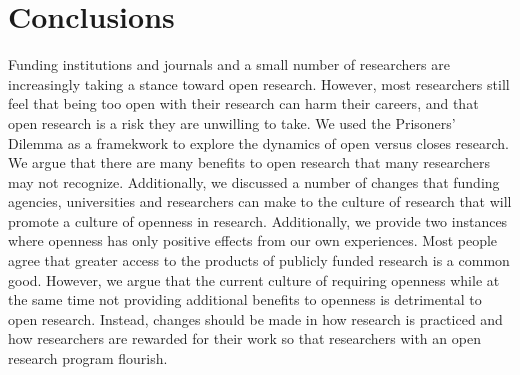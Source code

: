 \documentclass[11pt]{article} %
\begin{document}
\section{Conclusions}
Funding institutions and journals and a small number of researchers are increasingly taking a stance toward open research. However, most researchers still feel that being too open with their research can harm their careers, and that open research is a risk they are unwilling to take. We used the Prisoners' Dilemma as a framekwork to explore the dynamics of open versus closes research. We argue that there are many benefits to open research that many researchers may not recognize. Additionally, we discussed a number of changes that funding agencies, universities and researchers can make to the culture of research that will promote a culture of openness in research. Additionally, we provide two instances where openness has only positive effects from our own experiences. Most people agree that greater access to the products of publicly funded research is a common good. However, we argue that the current culture of requiring openness while at the same time not providing additional benefits to openness is detrimental to open research. Instead, changes should be made in how research is practiced and how researchers are rewarded for their work so that researchers with an open research program flourish.






\end{document}
